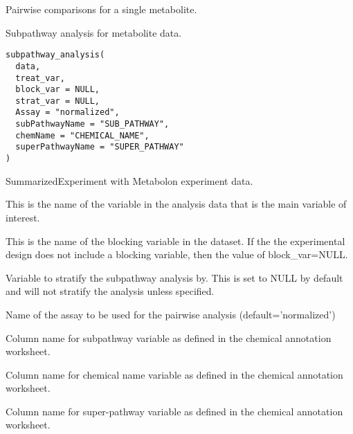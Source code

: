 \documentclass[a4paper]{book}
\begin{document}
%
\begin{Value}
Pairwise comparisons for a single metabolite.
\end{Value}
%
\begin{Description}
Subpathway analysis for metabolite data.
\end{Description}
%
\begin{Usage}
\begin{verbatim}
subpathway_analysis(
  data,
  treat_var,
  block_var = NULL,
  strat_var = NULL,
  Assay = "normalized",
  subPathwayName = "SUB_PATHWAY",
  chemName = "CHEMICAL_NAME",
  superPathwayName = "SUPER_PATHWAY"
)
\end{verbatim}
\end{Usage}
%
\begin{Arguments}
\begin{ldescription}
\item[\code{data}] SummarizedExperiment with Metabolon experiment data.

\item[\code{treat\_var}] This is the name of the variable in the analysis data that
is the main variable of interest.

\item[\code{block\_var}] This is the name of the blocking variable in the dataset.
If the the experimental design does not include a blocking variable, then the
value of block\_var=NULL.

\item[\code{strat\_var}] Variable to stratify the subpathway analysis by. This is set
to NULL by default and will not stratify the analysis unless specified.

\item[\code{Assay}] Name of the assay to be used for the pairwise analysis
(default='normalized')

\item[\code{subPathwayName}] Column name for subpathway variable as defined in the
chemical annotation worksheet.

\item[\code{chemName}] Column name for chemical name variable as defined in the
chemical annotation worksheet.

\item[\code{superPathwayName}] Column name for super-pathway variable as defined in
the chemical annotation worksheet.
\end{ldescription}
\end{Arguments}
\end{document}
